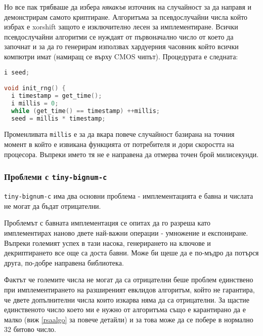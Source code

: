 Но все пак трябваше да избера \textit{някакъв} източник на случайност за да направя и демонстрирам самото криптиране. Алгоритъма за псевдослучайни числа който избрах е xorshift защото е изключително лесен за имплементиране. Всички псевдослучайни алгоритми се нуждаят от първоначално число от което да започнат и за да го генерирам използвах хардуерния часовник който всички компютри имат (намиращ се върху CMOS чипът). Процедурата е следната:
\begin{lstlisting}[language=C]
i seed;

void init_rng() {
  i timestamp = get_time();
  i millis = 0;
  while (get_time() == timestamp) ++millis;
  seed = millis * timestamp;
\end{lstlisting}
Променливата {\tt millis} е за да вкара повече случайност базирана на точния момент в който е извикана функцията от потребителя и дори скоростта на процесора. Въпреки името тя не е направена да отмерва точен брой милисекунди.

\subsubsection{Проблеми с {\tt tiny-bignum-c}}
{\tt tiny-bignum-c} има два основни проблема - имплементацията е бавна и числата не могат да бъдат отрицателни.

Проблемът с бавната имплементация се опитах да го разреша като имплементирах наново двете най-важни операции - умножение и експониране. Въпреки големият успех в тази насока, генерирането на ключове и декриптирането все още са доста бавни. Може би щеше да е по-мъдро да потърся друга, по-добре направена библиотека.

Фактът че големите числа не могат да са отрицателни беше проблем единствено при имплементирането на разширеният евклидов алгоритъм, който не гарантира, че двете допълнителни числа които изкарва няма да са отрицателни. За щастие единственото число което ми е нужно от алгоритъма също е карантирано да е малко (виж \ref{rsaalgo} за повече детайли) и за това може да се побере в нормално 32 битово число.


